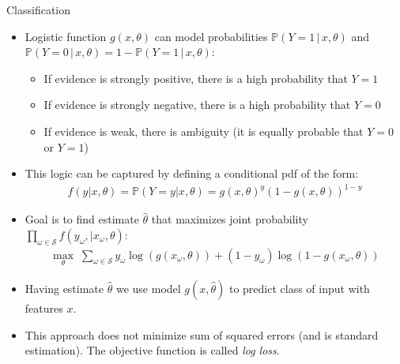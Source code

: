 \documentclass[9pt]{beamer}
\begin{document}
\begin{frame}{Classification}


\begin{itemize}
  \setlength{\itemsep}{10pt}
\item Logistic function $g(x,\theta)$ can model probabilities $\mathbb{P}(Y=1\,|\,x,\theta)$ and $\mathbb{P}(Y=0\,|\,x,\theta)=1-\mathbb{P}(Y=1\,|\,x,\theta)$:

\vspace{0.1in}
\begin{itemize}
  \setlength{\itemsep}{10pt}
\item If evidence is strongly positive, there is a high probability that $Y=1$
\item If evidence is strongly negative, there is a high probability that  $Y=0$
\item If evidence is weak, there is ambiguity (it is equally probable that $Y=0$ or $Y=1$)
\end{itemize}

\item This logic can be captured by defining a conditional pdf of the form:
\begin{align*}
f(y|x,\theta)=\mathbb{P}(Y=y|x,\theta)=g(x,\theta)^y(1-g(x,\theta))^{1-y}
\end{align*}
\item Goal is to find estimate $\hat{\theta}$ that maximizes joint probability $\prod_{\omega \in \mathcal{S}}f(y_\omega,|x_\omega,\theta)$:
\begin{align*}
\max_{\theta}\; \sum_{\omega \in \mathcal{S}}y_\omega\log(g(x_\omega,\theta))+(1-y_\omega)\log(1-g(x_\omega,\theta))
\end{align*}

\item Having estimate $\hat{\theta}$ we use model $g(x,\hat{\theta})$ to predict class of input with features $x$. 

\item This approach does not minimize sum of squared errors (and is standard estimation).  The objective function is called {\em log loss}. 
\end{itemize}

\end{frame}
\end{document}
